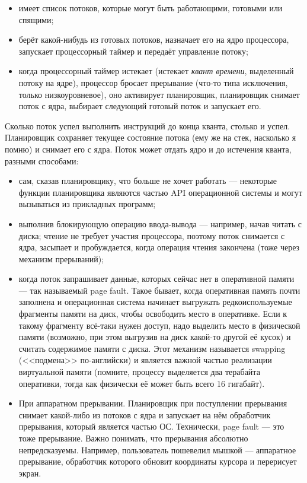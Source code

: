 \documentclass{../../text-style}
\begin{document}
\begin{itemize}
    \item имеет список потоков, которые могут быть работающими, готовыми или спящими;
    \item берёт какой-нибудь из готовых потоков, назначает его на ядро процессора, запускает процессорный таймер и передаёт управление потоку;
    \item когда процессорный таймер истекает (истекает \textit{квант времени}, выделенный потоку на ядре), процессор бросает прерывание (что-то типа исключения, только низкоуровневое), оно активирует планировщик, планировщик снимает поток с ядра, выбирает следующий готовый поток и запускает его.
\end{itemize}

Сколько поток успел выполнить инструкций до конца кванта, столько и успел. Планировщик сохраняет текущее состояние потока (ему же на стек, насколько я помню) и снимает его с ядра. Поток может отдать ядро и до истечения кванта, разными способами:

\begin{itemize}
    \item сам, сказав планировщику, что больше не хочет работать --- некоторые функции планировщика являются частью API операционной системы и могут вызываться из прикладных программ;
    \item выполнив блокирующую операцию ввода-вывода --- например, начав читать с диска; чтение не требует участия процессора, поэтому поток снимается с ядра, засыпает и пробуждается, когда операция чтения закончена (тоже через механизм прерываний);
    \item когда поток запрашивает данные, которых сейчас нет в оперативной памяти --- так называемый page fault. Такое бывает, когда оперативная память почти заполнена и операционная система начинает выгружать редкоиспользуемые фрагменты памяти на диск, чтобы освободить место в оперативке. Если к такому фрагменту всё-таки нужен доступ, надо выделить место в физической памяти (возможно, при этом выгрузив на диск какой-то другой её кусок) и считать содержимое памяти с диска. Этот механизм называется swapping (<<подмена>> по-английски) и является важной частью реализации виртуальной памяти (помните, процессу выделяется два терабайта оперативки, тогда как физически её может быть всего 16 гигабайт).
    \item При аппаратном прерывании. Планировщик при поступлении прерывания снимает какой-либо из потоков с ядра и запускает на нём обработчик прерывания, который является частью ОС. Технически, page fault --- это тоже прерывание. Важно понимать, что прерывания абсолютно непредсказуемы. Например, пользователь пошевелил мышкой --- аппаратное прерывание, обработчик которого обновит координаты курсора и перерисует экран.
\end{itemize}
\end{document}
